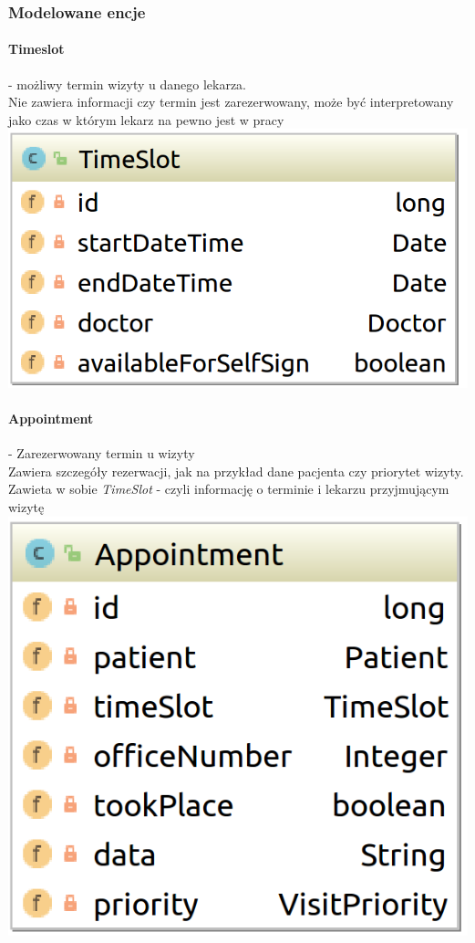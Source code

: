 \documentclass[polish,12pt]{aghthesis}
\begin{document}
\subsubsection{Modelowane encje}
    \paragraph{Timeslot} - możliwy termin wizyty u danego lekarza.\\
    Nie zawiera informacji czy termin jest zarezerwowany, może być interpretowany jako czas w którym lekarz na pewno jest w pracy \\
    \includegraphics[width=\textwidth]{TimeSlot}
    \paragraph{Appointment} - Zarezerwowany termin u wizyty \\
    Zawiera szczegóły rezerwacji, jak na przykład dane pacjenta czy priorytet wizyty.
    Zawieta w sobie \emph{TimeSlot} - czyli informację o terminie i lekarzu przyjmującym wizytę \\
    \includegraphics[width=\textwidth]{Appointment}
\end{document}

